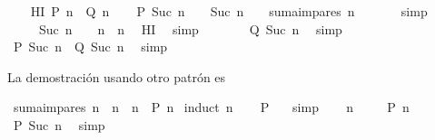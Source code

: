 \begin{isabellebody}
\ \ \isamarkupfalse%
\ HI{\isacharcolon}\ {\isachardoublequoteopen}{\isacharquery}P\ n\ {\isacharequal}\ {\isacharquery}Q\ n{\isachardoublequoteclose}\isanewline
\ \ \isamarkupfalse%
\ {\isachardoublequoteopen}{\isacharquery}P\ {\isacharparenleft}Suc\ n{\isacharparenright}\ {\isacharequal}\ {\isacharparenleft}{}\ {\isacharasterisk}\ {\isacharparenleft}Suc\ n{\isacharparenright}\ {\isacharminus}\ {}{\isacharparenright}\ {\isacharplus}\ suma{\isacharunderscore}impares\ n{\isachardoublequoteclose}\ \isanewline
\ \ \ \ \isamarkupfalse%
\ simp\isanewline
\ \ \isamarkupfalse%
\ \isamarkupfalse%
\ {\isachardoublequoteopen}{\isasymdots}\ {\isacharequal}\ {\isacharparenleft}{}\ {\isacharasterisk}\ {\isacharparenleft}Suc\ n{\isacharparenright}\ {\isacharminus}\ {}{\isacharparenright}\ {\isacharplus}\ n\ {\isacharasterisk}\ n{\isachardoublequoteclose}\ \isamarkupfalse%
\ HI\ \isamarkupfalse%
\ simp\isanewline
\ \ \isamarkupfalse%
\ \isamarkupfalse%
\ {\isachardoublequoteopen}{\isasymdots}\ {\isacharequal}\ {\isacharquery}Q\ {\isacharparenleft}Suc\ n{\isacharparenright}{\isachardoublequoteclose}\ \isamarkupfalse%
\ simp\isanewline
\ \ \isamarkupfalse%
\ \isamarkupfalse%
\ {\isachardoublequoteopen}{\isacharquery}P\ {\isacharparenleft}Suc\ n{\isacharparenright}\ {\isacharequal}\ {\isacharquery}Q\ {\isacharparenleft}Suc\ n{\isacharparenright}{\isachardoublequoteclose}\ \isamarkupfalse%
\ simp\isanewline
{}\isamarkupfalse%
%
\endisatagproof
{\isafoldproof}%
%
\isadelimproof
%
\endisadelimproof
%
\begin{isamarkuptext}%
La demostración usando otro patrón es%
\end{isamarkuptext}\isamarkuptrue%
\isamarkupfalse%
\ {\isachardoublequoteopen}suma{\isacharunderscore}impares\ n\ {\isacharequal}\ n\ {\isacharasterisk}\ n{\isachardoublequoteclose}\ {\isacharparenleft}\ {\isachardoublequoteopen}{\isacharquery}P\ n{\isachardoublequoteclose}{\isacharparenright}\isanewline
%
\isadelimproof
%
\endisadelimproof
%
\isatagproof
{}\isamarkupfalse%
\ {\isacharparenleft}induct\ n{\isacharparenright}\isanewline
\ \ \isamarkupfalse%
\ {\isachardoublequoteopen}{\isacharquery}P\ {}{\isachardoublequoteclose}\ \isamarkupfalse%
\ simp\isanewline
{}\isamarkupfalse%
\isanewline
\ \ \isamarkupfalse%
\ n\ \isanewline
\ \ \isamarkupfalse%
\ {\isachardoublequoteopen}{\isacharquery}P\ n{\isachardoublequoteclose}\isanewline
\ \ \isamarkupfalse%
\ \isamarkupfalse%
\ {\isachardoublequoteopen}{\isacharquery}P\ {\isacharparenleft}Suc\ n{\isacharparenright}{\isachardoublequoteclose}\ \isamarkupfalse%
\ simp\isanewline
{}\isamarkupfalse%
\isanewline
%
\endisatagproof
{\isafoldproof}%
%
\isadelimproof
%
\endisadelimproof
%
\isadelimtheory
%
\endisadelimtheory
%
\isatagtheory
%
\endisatagtheory
{\isafoldtheory}%
%
\isadelimtheory
%
\endisadelimtheory
%
\end{isabellebody}%
